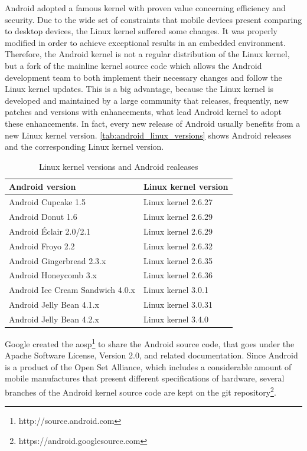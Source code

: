 Android adopted a famous kernel with proven value concerning efficiency and security. Due to the wide set of constraints that mobile devices present comparing to desktop devices, the Linux kernel suffered some changes. It was properly modified in order to achieve exceptional results in an embedded environment. Therefore, the Android kernel is not a regular distribution of the Linux kernel, but a fork of the mainline kernel source code which allows the Android development team to both implement their necessary changes and follow the Linux kernel updates. This is a big advantage, because the Linux kernel is developed and maintained by a large community that releases, frequently, new patches and versions with enhancements, what lead Android kernel to adopt these enhancements. In fact, every new release of Android usually benefits from a new Linux kernel version. \autoref{tab:android_linux_versions} shows Android releases and the corresponding Linux kernel version.

\begin{table}[h]
\begin{center}
\begin{tabular}{| l | l |}
\hline
\textbf{Android version} & \textbf{Linux kernel version} \\
\hline
Android Cupcake 1.5 & Linux kernel 2.6.27 \\
\hline
Android Donut 1.6 & Linux kernel 2.6.29\\
\hline
Android Éclair 2.0/2.1 & Linux kernel 2.6.29\\
\hline
Android Froyo 2.2 & Linux kernel 2.6.32\\
\hline
Android Gingerbread 2.3.x & Linux kernel 2.6.35\\
\hline
Android Honeycomb 3.x & Linux kernel 2.6.36\\
\hline
Android Ice Cream Sandwich 4.0.x & Linux kernel 3.0.1\\
\hline
Android Jelly Bean 4.1.x & Linux kernel 3.0.31\\
\hline
Android Jelly Bean 4.2.x & Linux kernel 3.4.0\\
\hline
\end{tabular}
\end{center}
\caption{Linux kernel versions and Android realeases}
\label{tab:android_linux_versions}
\end{table}

Google created the \gls{aosp}\footnote{http://source.android.com} to share the Android source code, that goes under the Apache Software License, Version 2.0, and related documentation. Since Android is a product of the Open Set Alliance, which includes a considerable amount of mobile manufactures that present different specifications of hardware, several branches of the Android kernel source code are kept on the git repository\footnote{https://android.googlesource.com}.

